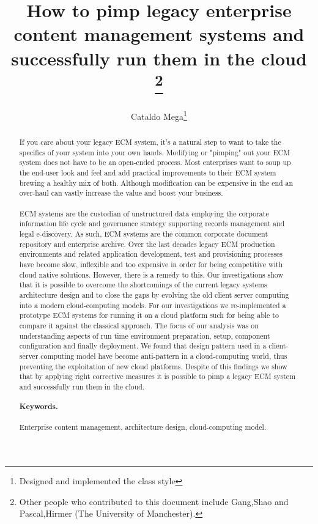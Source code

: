 \documentclass[EPiC]{easychair} %
\title{How to pimp legacy enterprise content management systems and successfully run them in the cloud
    \thanks{Other people who contributed to this document include Gang,Shao and Pascal,Hirmer (The University of
  Manchester).}}
\author{ Cataldo Mega\inst{1}\thanks{Designed and implemented the class style}}
\institute{ University of Stuttgart, Stuttgart, BW, Germany\\\email{cataldo.mega@ipvs.uni-stuttgart.de}}
\begin{document}

\begin{abstract}

  If you care about your legacy ECM system, it's a natural step to want to take the specifics of your system into your own hands. Modifying or "pimping" out your ECM system does not have to be an open-ended process. Most enterprises want to soup up the end-user look and feel and add practical improvements to their ECM system brewing a healthy mix of both. Although modification can be expensive in the end an over-haul can vastly increase the value and boost your business.
 
  \paragraph{} ECM systems are the custodian of unstructured data employing the corporate information life cycle and governance strategy supporting records management and legal e-discovery. As such, ECM systems are the common corporate document repository and enterprise archive. Over the last decades legacy ECM production environments and related application development, test and provisioning processes have become slow, inflexible and too expensive in order for being competitive with cloud native solutions. However, there is a remedy to this. Our investigations show that it is possible to overcome the shortcomings of the current legacy systems architecture design and to close the gaps by evolving the old client server computing into a modern cloud-computing models.
  For our investigations we re-implemented a prototype ECM systems for running it on a cloud platform such for being able to compare it against the classical approach. The focus of our analysis was on understanding aspects of run time environment preparation, setup, component configuration and finally deployment. We found that design pattern used in a client-server computing model have become anti-pattern in a cloud-computing world, thus preventing the exploitation of new cloud platforms. Despite of this findings we show that by applying right corrective measures it is possible to pimp a legacy ECM system and successfully run them in the cloud.        
  
  \paragraph{Keywords.} Enterprise content management, architecture design, cloud-computing model.
  
\end{abstract}
\end{document}
